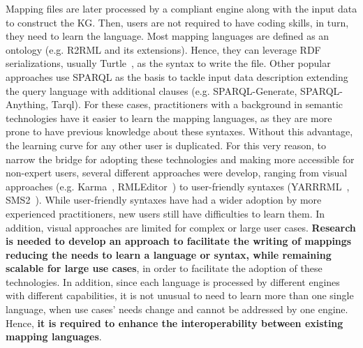 
Mapping files are later processed by a compliant engine along with the input data to construct the KG. Then, users are not required to have coding skills, in turn, they need to learn the language. Most mapping languages are defined as an ontology (e.g. R2RML and its extensions). Hence, they can leverage RDF serializations, usually Turtle~\citep{turtle}, as the syntax to write the file. Other popular approaches use SPARQL as the basis to tackle input data description extending the query language with additional clauses (e.g. SPARQL-Generate, SPARQL-Anything, Tarql). For these cases, practitioners with a background in semantic technologies have it easier to learn the mapping languages, as they are more prone to have previous knowledge about these syntaxes. Without this advantage, the learning curve for any other user is duplicated. For this very reason, to narrow the bridge for adopting these technologies and making more accessible for non-expert users, several different approaches were develop, ranging from visual approaches (e.g. Karma~\citep{gupta2012karma}, RMLEditor~\citep{heyvaert2016rmleditor}) to user-friendly syntaxes (YARRRML~\citep{Heyvaert2018yarrrml}, SMS2~\citep{sms2}). While user-friendly syntaxes have had a wider adoption by more experienced practitioners, new users still have difficulties to learn them. In addition, visual approaches are limited for complex or large user cases. \textbf{Research is needed to develop an approach to facilitate the writing of mappings reducing the needs to learn a language or syntax, while remaining scalable for large use cases}, in order to facilitate the adoption of these technologies. In addition, since each language is processed by different engines with different capabilities, it is not unusual to need to learn more than one single language, when use cases' needs change and cannot be addressed by one engine. Hence, \textbf{it is required to enhance the interoperability between existing mapping languages}. 

